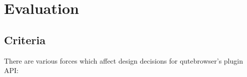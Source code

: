 \documentclass[a4paper,parskip=full]{scrreprt}
\begin{document}



\chapter{Evaluation}

\section{Criteria}

\label{criteria}

There are various forces which affect design decisions for qutebrowser's plugin
API:
\end{document}

